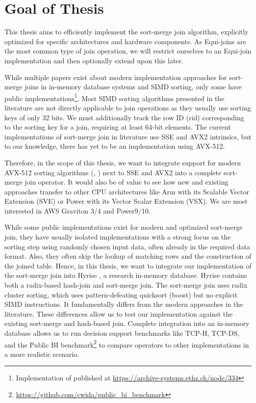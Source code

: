 \section{Goal of Thesis}
\label{sec:goal}


This thesis aims to efficiently implement the sort-merge join algorithm,
explicitly optimized for specific architectures and hardware components. 
As Equi-joins are the most common type of join operation,
we will restrict ourselves to an Equi-join implementation and then optionally extend upon this later.

While multiple papers exist about modern implementation approaches for sort-merge joins in in-memory database systems
and SIMD sorting, only some have public 
implementations\footnote{Implementation of \cite{Balkesen} published at \url{https://archive-systems.ethz.ch/node/334}}.
Most SIMD sorting algorithms
presented in the literature are not directly applicable to join operations as they usually use
sorting keys of only 32 bits. We must additionally track the row ID (rid) corresponding to the sorting key for
a join, requiring at least 64-bit elements. The current implementations of sort-merge join in literature use SSE and AVX2 intrinsics,
but to our knowledge, there has yet to be an implementation using AVX-512. 

Therefore, in the scope
of this thesis, we want to integrate support for modern AVX-512 sorting algorithms (\cite{Watkins}, \cite{8855628})
next to SSE and AVX2 into a complete sort-merge join operator.
It would also be of value to see how new and existing approaches transfer to other CPU
architectures like Arm with its Scalable Vector Extension (SVE) or Power with its Vector Scalar
Extension (VSX). We are most interested in AWS Graviton 3/4 and Power9/10.

While some public implementations
exist for modern and optimized sort-merge join, they have usually isolated implementations with a strong
focus on the sorting step using randomly chosen input data, often already in the required data format. 
Also, they often skip the lookup of matching rows and the construction of the joined table.
Hence, in this thesis, we want to integrate our implementation of the sort-merge join into Hyrise
\cite{DBLP:conf/edbt/DreselerK0KUP19},
a research in-memory database. Hyrise contains both a radix-based hash-join and sort-merge join.
The sort-merge join uses radix cluster sorting, which uses pattern-defeating quicksort (boost)
but no explicit SIMD instructions. It fundamentally differs from the modern approaches in the literature.
These differences allow us to test our implementation against the existing sort-merge and hash-based join.
Complete integration into an in-memory database allows us to run decision support benchmarks
like TCP-H, TCP-DS, and the Public BI benchmark\footnote{\url{https://github.com/cwida/public_bi_benchmark}} to compare operators to other implementations in a 
more realistic scenario.

